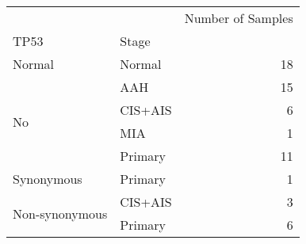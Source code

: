 \begin{tabular}{l|lr}
\toprule
               &         & Number of Samples \\
TP53 & Stage &                   \\
\midrule
Normal & Normal &                18 \\
\multirow{4}{*}{No} & AAH &                15 \\
               & CIS+AIS &                 6 \\
               & MIA &                 1 \\
               & Primary &                11 \\
\cline{1-3}
Synonymous & Primary &                 1 \\
\multirow{2}{*}{Non-synonymous} & CIS+AIS &                 3 \\
               & Primary &                 6 \\
\bottomrule
\end{tabular}
